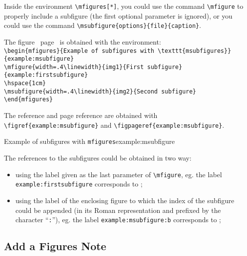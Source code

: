 \documentclass[book,taskpackage,specpackage,codepackage]{upmethodology-document}
\begin{document}
Inside the environment \texttt{{\textbackslash}mfigures[*]}, you could use the command \texttt{{\textbackslash}mfigure} to properly include a subfigure (the first optional parameter is ignored), or you could use the command \texttt{{\textbackslash}msubfigure\{options\}\{file\}\{caption\}}.

The figure~ page~ is obtained with the environment:\\
\texttt{{\textbackslash}begin\{mfigures\}\{Example of subfigures with {\textbackslash}texttt\{msubfigures\}\}\{example:msubfigure\}}\\
\texttt{{\textbackslash}mfigure\{width=.4{\textbackslash}linewidth\}\{img1\}\{First subfigure\}\{example:firstsubfigure\}} \\
\texttt{{\textbackslash}hspace\{1cm\}} \\
\texttt{{\textbackslash}msubfigure\{width=.4{\textbackslash}linewidth\}\{img2\}\{Second subfigure\}} \\
\texttt{{\textbackslash}end\{mfigures\}}

The reference and page reference are obtained with \texttt{{\textbackslash}figref\{example:msubfigure\}} and \texttt{{\textbackslash}figpageref\{example:msubfigure\}}.

\begin{mfigures}{Example of subfigures with \texttt{mfigures}}{example:msubfigure}
	\hspace{1cm}
\end{mfigures}

The references to the subfigures could be obtained in two way:\nopagebreak\begin{itemize}
\item using the label given as the last parameter of \texttt{{\textbackslash}mfigure}, eg. the label \texttt{example:firstsubfigure} corresponds to ;
\item using the label of the enclosing figure to which the index of the subfigure could be appended (in its Roman representation and prefixed by the character ``\texttt{:}''), eg. the label \texttt{example:msubfigure:b} corresponds to ;
\end{itemize}

\subsection{Add a Figures Note}
\end{document}
